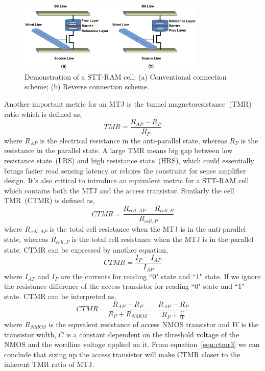\begin{figure}[t]
  \centering
  \includegraphics[width=3.5in]{fig/sttramcell.eps}
  \vspace{-10pt}
  \caption{Demonstration of a STT-RAM cell: (a) Conventional connection scheme; (b) Reverse connection scheme.}
  \label{fig:sttcell}
  \vspace{-15pt}
\end{figure}

Another important metric for an MTJ is the tunnel magnetoresistance~(TMR) ratio which is defined as,
\begin{equation}
TMR = \frac{R_{AP}-R_{P}}{R_{P}}
\label{eqn:tmr}
\end{equation}
where ${R_{AP}}$ is the electrical resistance in the anti-parallel state, whereas ${R_{P}}$ is the resistance in the parallel state. A large TMR means big gap between low resistance state~(LRS) and high resistance state~(HRS), which could essentially brings faster read sensing latency or relaxes the constraint for sense amplifier design. It's also critical to introduce an equivalent metric for a STT-RAM cell which contains both the MTJ and the access transistor. Similarly the cell TMR~(CTMR) is defined as,
\begin{equation}
CTMR = \frac{R_{cell,AP}-R_{cell,P}}{R_{cell,P}}
\label{eqn:ctmr}
\end{equation}
where $R_{cell,AP}$ is the total cell resistance when the MTJ is in the anti-parallel state, whereas $R_{cell,P}$ is the total cell resistance when the MTJ is in the parallel state. CTMR can be expressed by another equation,
\begin{equation}
CTMR = \frac{I_{P}-I_{AP}}{I_{AP}}
\label{eqn:ctmr2}
\end{equation}
where ${I_{AP}}$ and ${I_{P}}$ are the currents for reading ``0" state and ``1" state. If we ignore the resistance difference of the access transistor for reading ``0" state and ``1" state. CTMR can be interpreted as,
\begin{equation}
CTMR = \frac{R_{AP}-R_{P}}{R_{P}+R_{NMOS}} = \frac{R_{AP}-R_{P}}{R_{P}+\frac{C}{W}}
\label{eqn:ctmr3}
\end{equation}
where $R_{NMOS}$ is the equvalent resistance of access NMOS transistor and $W$ is the transistor width, $C$ is a constant dependent on the threshold voltage of the NMOS and the wordline voltage applied on it. From equation~\ref{eqn:ctmr3} we can conclude that sizing up the access transistor will make CTMR closer to the inherent TMR ratio of MTJ.

